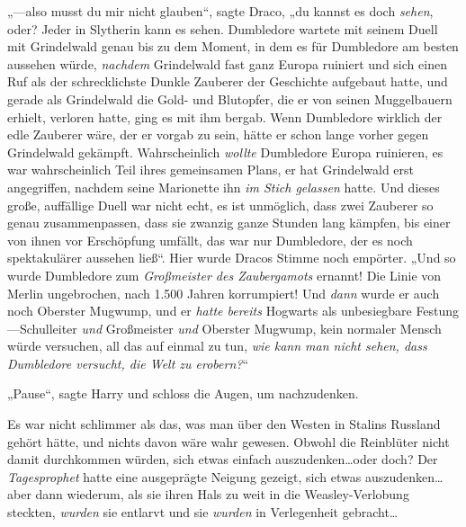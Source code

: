 „—also musst du mir nicht glauben“, sagte Draco, „du kannst es doch \emph{sehen}, oder? Jeder in Slytherin kann es sehen. Dumbledore wartete mit seinem Duell mit Grindelwald genau bis zu dem Moment, in dem es für Dumbledore am besten aussehen würde, \emph{nachdem} Grindelwald fast ganz Europa ruiniert und sich einen Ruf als der schrecklichste Dunkle Zauberer der Geschichte aufgebaut hatte, und gerade als Grindelwald die Gold- und Blutopfer, die er von seinen Muggelbauern erhielt, verloren hatte, ging es mit ihm bergab. Wenn Dumbledore wirklich der edle Zauberer wäre, der er vorgab zu sein, hätte er schon lange vorher gegen Grindelwald gekämpft. Wahrscheinlich \emph{wollte} Dumbledore Europa ruinieren, es war wahrscheinlich Teil ihres gemeinsamen Plans, er hat Grindelwald erst angegriffen, nachdem seine Marionette ihn \emph{im Stich gelassen} hatte. Und dieses große, auffällige Duell war nicht echt, es ist unmöglich, dass zwei Zauberer so genau zusammenpassen, dass sie zwanzig ganze Stunden lang kämpfen, bis einer von ihnen vor Erschöpfung umfällt, das war nur Dumbledore, der es noch spektakulärer aussehen ließ“. Hier wurde Dracos Stimme noch empörter. „Und so wurde Dumbledore zum \emph{Großmeister des Zaubergamots} ernannt! Die Linie von Merlin ungebrochen, nach 1.500 Jahren korrumpiert! Und \emph{dann} wurde er auch noch Oberster Mugwump, und er \emph{hatte bereits} Hogwarts als unbesiegbare Festung—Schulleiter \emph{und} Großmeister \emph{und} Oberster Mugwump, kein normaler Mensch würde versuchen, all das auf einmal zu tun, \emph{wie kann man nicht sehen, dass Dumbledore versucht, die Welt zu erobern?}“

„Pause“, sagte Harry und schloss die Augen, um nachzudenken.

Es war nicht schlimmer als das, was man über den Westen in Stalins Russland gehört hätte, und nichts davon wäre wahr gewesen. Obwohl die Reinblüter nicht damit durchkommen würden, sich etwas einfach auszudenken…oder doch? Der \emph{Tagesprophet} hatte eine ausgeprägte Neigung gezeigt, sich etwas auszudenken…aber dann wiederum, als sie ihren Hals zu weit in die Weasley-Verlobung steckten, \emph{wurden} sie entlarvt und sie \emph{wurden} in Verlegenheit gebracht…


